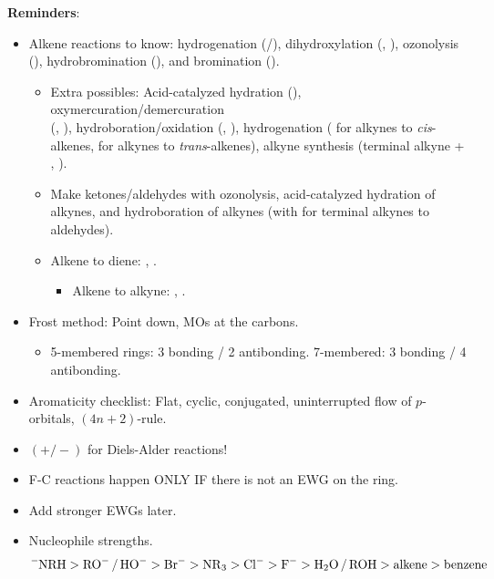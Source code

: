 \documentclass[../notes.tex]{subfiles}
\begin{document}
\textbf{Reminders}:
\begin{itemize}
    \item Alkene reactions to know: hydrogenation (/), dihydroxylation (, ), ozonolysis (), hydrobromination (), and bromination ().
    \begin{itemize}
        \item Extra possibles: Acid-catalyzed hydration (), oxymercuration/demercuration\\(, ), hydroboration/oxidation (, ), hydrogenation ( for alkynes to \emph{cis}-alkenes,  for alkynes to \emph{trans}-alkenes), alkyne synthesis (terminal alkyne + , ).
        \item Make ketones/aldehydes with ozonolysis, acid-catalyzed hydration of alkynes, and hydroboration of alkynes (with  for terminal alkynes to aldehydes).
        \item Alkene to diene: , .
        \begin{itemize}
            \item Alkene to alkyne: , .
        \end{itemize}
    \end{itemize}
    \item Frost method: Point down, MOs at the carbons.
    \begin{itemize}
        \item 5-membered rings: 3 bonding / 2 antibonding. 7-membered: 3 bonding / 4 antibonding.
    \end{itemize}
    \item Aromaticity checklist: Flat, cyclic, conjugated, uninterrupted flow of $p$-orbitals, $(4n+2)$-rule.
    \item $(+/-)$ for Diels-Alder reactions!
    \item F-C reactions happen ONLY IF there is not an EWG on the ring.
    \item Add stronger EWGs later.
    \item Nucleophile strengths.
    \begin{equation*}
        \ce{{}^-NRH} > \ce{RO- / HO-}
        > \ce{Br-}
        > \ce{NR3}
        > \ce{Cl-}
        > \ce{F-}
        > \ce{H2O / ROH}
        > \text{alkene}
        > \text{benzene}
    \end{equation*}
\end{itemize}
\end{document}
